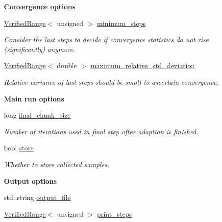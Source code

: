 \begin{Indent}{\bf Convergence options}
\begin{DoxyCompactItemize}
\hyperlink{classeos_1_1VerifiedRange}{VerifiedRange}$<$ unsigned $>$ \hyperlink{structeos_1_1PopulationMonteCarloSampler_1_1Config_ac7a03e69442b543fc2cacaa647988741}{minimum\_\-steps}
\begin{DoxyCompactList}\small\item\em Consider the last steps to decide if convergence statistics do not rise (significantly) anymore. \item\end{DoxyCompactList}\item 
\hyperlink{classeos_1_1VerifiedRange}{VerifiedRange}$<$ double $>$ \hyperlink{structeos_1_1PopulationMonteCarloSampler_1_1Config_ac0e8dec5f8ba7e5f0c997dd8a65fc231}{maximum\_\-relative\_\-std\_\-deviation}
\begin{DoxyCompactList}\small\item\em Relative variance of last steps should be small to ascertain convergence. \item\end{DoxyCompactList}\end{DoxyCompactItemize}
\end{Indent}
\begin{Indent}{\bf Main run options}\par
{\em \label{_amgrp03ae0482f9408262df632e84148db84d}
 }\begin{DoxyCompactItemize}
\item 
long \hyperlink{structeos_1_1PopulationMonteCarloSampler_1_1Config_ac5a61846614b1bb67bdde95df03b5663}{final\_\-chunk\_\-size}
\begin{DoxyCompactList}\small\item\em Number of iterations used in final step after adaption is finished. \item\end{DoxyCompactList}\item 
bool \hyperlink{structeos_1_1PopulationMonteCarloSampler_1_1Config_a3dffd8c05d907bae4e3aaaf1733d93c1}{store}
\begin{DoxyCompactList}\small\item\em Whether to store collected samples. \item\end{DoxyCompactList}\end{DoxyCompactItemize}
\end{Indent}
\begin{Indent}{\bf Output options}\par
{\em \label{_amgrpa3beb290cb264578f0ef293e44984365}
 }\begin{DoxyCompactItemize}
\item 
std::string \hyperlink{structeos_1_1PopulationMonteCarloSampler_1_1Config_abe31836405a05391987afe00f1f231d3}{output\_\-file}
\item 
\hyperlink{classeos_1_1VerifiedRange}{VerifiedRange}$<$ unsigned $>$ \hyperlink{structeos_1_1PopulationMonteCarloSampler_1_1Config_a55d2a98f36625d31eb9117c76212771f}{print\_\-steps}
\end{DoxyCompactItemize}
\end{Indent}


